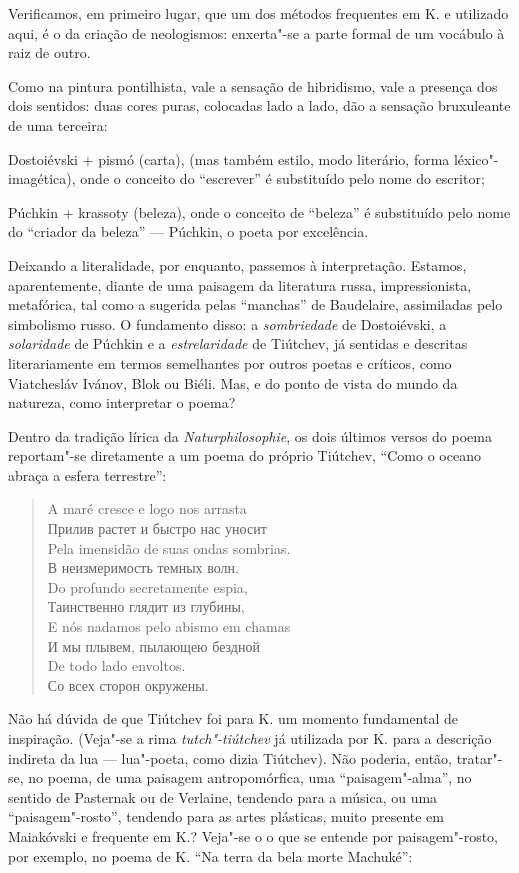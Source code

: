 Verificamos, em primeiro lugar, que um dos métodos frequentes em K. e
utilizado aqui, é o da criação de neologismos: enxerta"-se a parte formal
de um vocábulo à raiz de outro.

Como na pintura pontilhista, vale a sensação de hibridismo, vale a
presença dos dois sentidos: duas cores puras, colocadas lado a lado, dão a
sensação bruxuleante de uma terceira:

Dostoiévski + pismó (carta), (mas também estilo, modo literário, forma
léxico"-imagética), onde o conceito do ``escrever'' é substituído pelo
nome do escritor;

Púchkin + krassoty (beleza), onde o conceito de ``beleza'' é substituído
pelo nome do ``criador da beleza'' --- Púchkin, o poeta por excelência.

Deixando a literalidade, por enquanto, passemos à interpretação.
Estamos, aparentemente, diante de uma paisagem da literatura russa,
impressionista, metafórica, tal como a sugerida pelas ``manchas'' de
Baudelaire, assimiladas pelo simbolismo russo. O fundamento disso: a
\emph{sombriedade} de Dostoiévski, a \emph{solaridade} de Púchkin e a
\emph{estrelaridade} de Tiútchev, já sentidas e descritas literariamente
em termos semelhantes por outros poetas e críticos, como Viatchesláv
Ivánov, Blok ou Biéli. Mas, e do ponto de vista do mundo da natureza,
como interpretar o poema?

Dentro da tradição lírica da \emph{Naturphilosophie}, os dois últimos
versos do poema reportam"-se diretamente a um poema do próprio Tiútchev,
``Como o oceano abraça a esfera terrestre'':

\begin{verse}
A maré cresce e logo nos arrasta \\
Прилив растет и быстро нас уносит \\[8pt]
Pela imensidão de suas ondas sombrias. \\
В неизмеримость темных волн. \\[8pt]
Do profundo secretamente espia, \\
Таинственно глядит из глубины, \\[8pt]
E nós nadamos pelo abismo em chamas \\
И мы плывем, пылающею бездной \\[8pt]
De todo lado envoltos. \\
Со всех сторон окружены.
\end{verse}

Não há dúvida de que Tiútchev foi para K. um momento fundamental de
inspiração. (Veja"-se a rima \emph{tutch"-tiútchev} já utilizada por
K. para a descrição indireta da lua --- lua"-poeta, como dizia Tiútchev).
Não poderia, então, tratar"-se, no poema, de uma paisagem
antropomórfica, uma ``paisagem"-alma'', no sentido de Pasternak ou de
Verlaine, tendendo para a música, ou uma ``paisagem"-rosto'', tendendo para
as artes plásticas, muito presente em Maiakóvski e frequente em K.?
Veja"-se o o que se entende por paisagem"-rosto, por exemplo, no poema de
K. ``Na terra da bela morte Machuké'':


